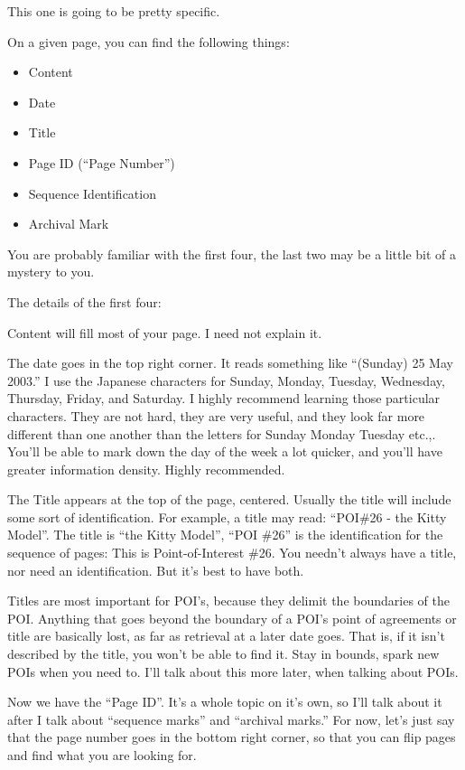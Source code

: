 \documentclass[oneside]{book}
\begin{document}
This one is going to be pretty specific.

On a given page, you can find the following things:

\begin{itemize}
\item Content
\item Date
\item Title
\item Page ID (``Page Number'')
\item Sequence Identification
\item Archival Mark
\end{itemize}

You are probably familiar with the first four, the last two may be a
little bit of a mystery to you.

The details of the first four:

Content will fill most of your page. I need not explain it.

The date goes in the top right corner. It reads something like
``(Sunday) 25 May 2003.'' I use the Japanese characters for Sunday,
Monday, Tuesday, Wednesday, Thursday, Friday, and Saturday. I highly
recommend learning those particular characters. They are not hard,
they are very useful, and they look far more different than one
another than the letters for Sunday Monday Tuesday etc.,. You'll be
able to mark down the day of the week a lot quicker, and you'll have
greater information density. Highly recommended.

The Title appears at the top of the page, centered. Usually the title
will include some sort of identification. For example, a title may
read: ``POI\#26 - the Kitty Model''. The title is ``the Kitty
Model'', ``POI \#26'' is the identification for the sequence of pages:
This is Point-of-Interest \#26. You needn't always have a title, nor
need an identification. But it's best to have both.

Titles are most important for POI's, because they delimit the
boundaries of the POI. Anything that goes beyond the boundary of a
POI's point of agreements or title are basically lost, as far as
retrieval at a later date goes. That is, if it isn't described by the
title, you won't be able to find it. Stay in bounds, spark new POIs
when you need to. I'll talk about this more later, when talking about
POIs.

Now we have the ``Page ID''. It's a whole topic on it's own, so I'll
talk about it after I talk about ``sequence marks'' and ``archival
marks.'' For now, let's just say that the page number goes in the
bottom right corner, so that you can flip pages and find what you are
looking for.
\end{document}
